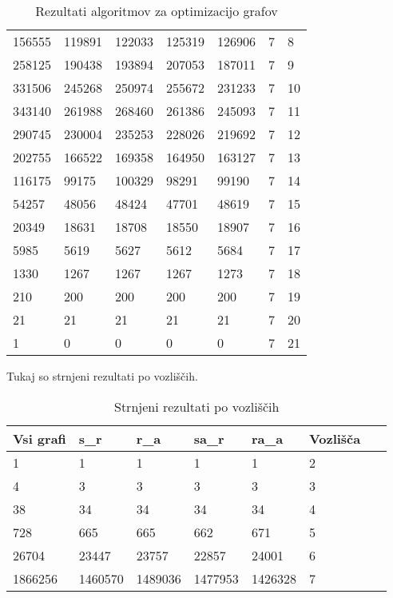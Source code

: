 \documentclass[fin1, tisk]{fmfdelo}
\begin{document}
\begin{table}[h]
\begin{tabular}{|l|l|l|l|l|l|l|}
        156555 & 119891 & 122033 & 125319 & 126906 & 7 & 8 \\ 
        258125 & 190438 & 193894 & 207053 & 187011 & 7 & 9 \\ 
        331506 & 245268 & 250974 & 255672 & 231233 & 7 & 10 \\ 
        343140 & 261988 & 268460 & 261386 & 245093 & 7 & 11 \\ 
        290745 & 230004 & 235253 & 228026 & 219692 & 7 & 12 \\ 
        202755 & 166522 & 169358 & 164950 & 163127 & 7 & 13 \\ 
        116175 & 99175 & 100329 & 98291 & 99190 & 7 & 14 \\ 
        54257 & 48056 & 48424 & 47701 & 48619 & 7 & 15 \\ 
        20349 & 18631 & 18708 & 18550 & 18907 & 7 & 16 \\ 
        5985 & 5619 & 5627 & 5612 & 5684 & 7 & 17 \\ 
        1330 & 1267 & 1267 & 1267 & 1273 & 7 & 18 \\ 
        210 & 200 & 200 & 200 & 200 & 7 & 19 \\ 
        21 & 21 & 21 & 21 & 21 & 7 & 20 \\ 
        1 & 0 & 0 & 0 & 0 & 7 & 21 \\ 
    \end{tabular}
    \caption{Rezultati algoritmov za optimizacijo grafov}
\end{table}

Tukaj so strnjeni rezultati po vozliščih.

\begin{table}[h]
    \centering
    \scriptsize
    \begin{tabular}{|l|l|l|l|l|l|l|}
    \hline
        Vsi grafi & s\_r & r\_a & sa\_r & ra\_a & Vozlišča & ~ \\ 
        \hline
        1 & 1 & 1 & 1 & 1 & 2 & ~ \\ 
        4 & 3 & 3 & 3 & 3 & 3 & ~ \\ 
        38 & 34 & 34 & 34 & 34 & 4 & ~ \\ 
        728 & 665 & 665 & 662 & 671 & 5 & ~ \\ 
        26704 & 23447 & 23757 & 22857 & 24001 & 6 & ~ \\ 
        1866256 & 1460570 & 1489036 & 1477953 & 1426328 & 7 & ~ \\ 
    \end{tabular}
    \caption{Strnjeni rezultati po vozliščih}
\end{table}
\end{document}
